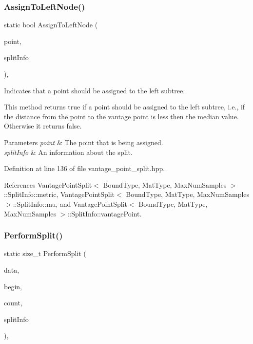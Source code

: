 \subsubsection{Assign\+To\+Left\+Node()}
{\footnotesize\ttfamily static bool Assign\+To\+Left\+Node (\begin{DoxyParamCaption}\item[{const Vec\+Type \&}]{point,  }\item[{const \textbf{ Split\+Info} \&}]{split\+Info }\end{DoxyParamCaption})\hspace{0.3cm}{\ttfamily [inline]}, {\ttfamily [static]}}



Indicates that a point should be assigned to the left subtree. 

This method returns true if a point should be assigned to the left subtree, i.\+e., if the distance from the point to the vantage point is less then the median value. Otherwise it returns false.


\begin{DoxyParams}{Parameters}
{\em point} & The point that is being assigned. \\
\hline
{\em split\+Info} & An information about the split. \\
\hline
\end{DoxyParams}


Definition at line 136 of file vantage\+\_\+point\+\_\+split.\+hpp.



References Vantage\+Point\+Split$<$ Bound\+Type, Mat\+Type, Max\+Num\+Samples $>$\+::\+Split\+Info\+::metric, Vantage\+Point\+Split$<$ Bound\+Type, Mat\+Type, Max\+Num\+Samples $>$\+::\+Split\+Info\+::mu, and Vantage\+Point\+Split$<$ Bound\+Type, Mat\+Type, Max\+Num\+Samples $>$\+::\+Split\+Info\+::vantage\+Point.

\mbox{\label{classmlpack_1_1tree_1_1VantagePointSplit_aace8240352cb3ea61c975987b91a80a6}} 
\subsubsection{Perform\+Split()\hspace{0.1cm}{\footnotesize\ttfamily [1/2]}}
{\footnotesize\ttfamily static size\+\_\+t Perform\+Split (\begin{DoxyParamCaption}\item[{Mat\+Type \&}]{data,  }\item[{const size\+\_\+t}]{begin,  }\item[{const size\+\_\+t}]{count,  }\item[{const \textbf{ Split\+Info} \&}]{split\+Info }\end{DoxyParamCaption})\hspace{0.3cm}{\ttfamily [inline]}, {\ttfamily [static]}}



